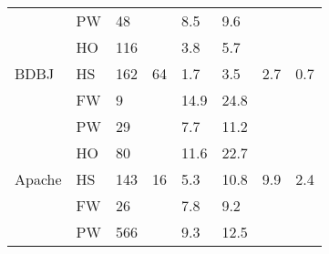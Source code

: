 \begin{figure*}[!t]
\begin{tabular}{|l|l|l|l|l|l|l|l|}
                                   & PW                              & 48                              &                                            & \cellcolor[HTML]{C0C0C0}8.5  & \cellcolor[HTML]{C0C0C0}9.6  &                       &                       \\ \cline{2-3} \cline{5-6}
                                   & HO                              & 116                             &                                            & \cellcolor[HTML]{C0C0C0}3.8  & \cellcolor[HTML]{C0C0C0}5.7  &                       &                       \\ \cline{2-3} \cline{5-6}
\multirow{-4}{*}{BDBJ}             & HS                              & 162                             & \multirow{-4}{*}{64}                       & 1.7                          & 3.5                          & \multirow{-4}{*}{2.7} & \multirow{-4}{*}{0.7} \\ \hline
                                   & FW                              & 9                               &                                            & \cellcolor[HTML]{C0C0C0}14.9 & \cellcolor[HTML]{C0C0C0}24.8 &                       &                       \\ \cline{2-3} \cline{5-6}
                                   & PW                              & 29                              &                                            & \cellcolor[HTML]{C0C0C0}7.7  & \cellcolor[HTML]{C0C0C0}11.2 &                       &                       \\ \cline{2-3} \cline{5-6}
                                   & HO                              & 80                              &                                            & \cellcolor[HTML]{C0C0C0}11.6 & \cellcolor[HTML]{C0C0C0}22.7 &                       &                       \\ \cline{2-3} \cline{5-6}
\multirow{-4}{*}{Apache}           & HS                              & 143                             & \multirow{-4}{*}{16}                       & 5.3                          & 10.8                         & \multirow{-4}{*}{9.9} & \multirow{-4}{*}{2.4} \\ \hline
                                   & FW                              & 26                              &                                            & \cellcolor[HTML]{C0C0C0}7.8  & \cellcolor[HTML]{C0C0C0}9.2  &                       &                       \\ \cline{2-3} \cline{5-6}
                                   & PW                              & 566                             &                                            & \cellcolor[HTML]{C0C0C0}9.3  & \cellcolor[HTML]{C0C0C0}12.5 &                       &                       \\ \cline{2-3} \cline{5-6}

\end{tabular}
\end{figure*}

